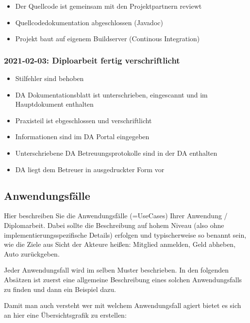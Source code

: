 \documentclass[
    headings=optiontotocandhead,%
    twoside,
    numbers=noenddot,%
    12pt, %
    titlepage, %
    parskip=full, %
    listof=leveldown, 
    numbers=noenddot, %
    a4paper,DIV=14,
    BCOR=15mm,
]{scrbook}
\providecommand{\tightlist}{%
  \setlength{\itemsep}{0pt}\setlength{\parskip}{0pt}}
\begin{document}
\begin{itemize}
\tightlist
\item
  Der Quellcode ist gemeinsam mit den Projektpartnern reviewt
\item
  Quellcodedokumentation abgeschlossen (Javadoc)
\item
  Projekt baut auf eigenem Buildserver (Continous Integration)
\end{itemize}

\hypertarget{diploarbeit-fertig-verschriftlicht}{%
\subsubsection{2021-02-03: Diploarbeit fertig
verschriftlicht}\label{diploarbeit-fertig-verschriftlicht}}

\begin{itemize}
\tightlist
\item
  Stilfehler sind behoben
\item
  DA Dokumentationsblatt ist unterschrieben, eingescannt und im
  Hauptdokument enthalten
\item
  Praxisteil ist ebgeschlossen und verschriftlicht
\item
  Informationen sind im DA Portal eingegeben
\item
  Unterschriebene DA Betreuungsprotokolle sind in der DA enthalten
\item
  DA liegt dem Betreuer in ausgedruckter Form vor
\end{itemize}

\hypertarget{anwendungsfuxe4lle}{%
\subsection{Anwendungsfälle}\label{anwendungsfuxe4lle}}

Hier beschreiben Sie die Anwendungsfälle (=UseCases) Ihrer Anwendung /
Diplomarbeit. Dabei sollte die Beschreibung auf hohem Niveau (also ohne
implementierungsspezifische Details) erfolgen und typischerweise so
benannt sein, wie die Ziele aus Sicht der Akteure heißen: Mitglied
anmelden, Geld abheben, Auto zurückgeben.

Jeder Anwendungsfall wird im selben Muster beschrieben. In den folgenden
Absätzen ist zuerst eine allgemeine Beschreibung eines solchen
Anwendungsfalls zu finden und dann ein Beispiel dazu.

Damit man auch versteht wer mit welchem Anwendungsfall agiert bietet es
sich an hier eine Übersichtsgrafik zu erstellen:
\end{document}
